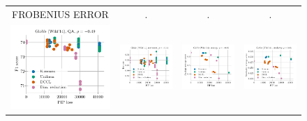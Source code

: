 \begin{figure}
\begin{tabular}{@{\hskip -0.0in}c@{\hskip -0.0in}c@{\hskip -0.0in}c@{\hskip -0.0in}c@{\hskip -0.0in}}
		FROBENIUS ERROR & . & . & . \\		
		\includegraphics[width=.245\linewidth]{figures/glove400k_qa_best-f1_vs_gram-large-dim-frob-error_linx.pdf} &
		\includegraphics[width=.245\linewidth]{figures/glove400k_sentiment_trec_test-acc_vs_gram-large-dim-frob-error_linx.pdf} &
		\includegraphics[width=.245\linewidth]{figures/glove400k_intrinsics_analogy-avg-score_vs_gram-large-dim-frob-error_linx.pdf} &
		\includegraphics[width=.245\linewidth]{figures/glove400k_intrinsics_similarity-avg-score_vs_gram-large-dim-frob-error_linx.pdf} \\
		

\end{tabular}
\end{figure}
